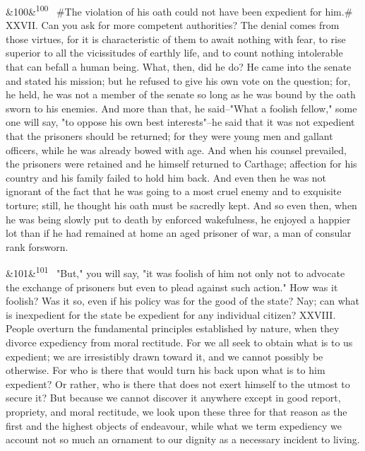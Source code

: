 \documentclass[12pt]{article}
\newcommand{\para}[1][]{\par\noindent\ifx&#1&\else\textsuperscript{\footnotesize #1}~\fi}
\begin{document}
\para[100] \#The violation of his oath could not have been expedient for him.\# XXVII. Can you ask for more competent authorities? The denial comes from those virtues, for it is characteristic of them to await nothing with fear, to rise superior to all the vicissitudes of earthly life, and to count nothing intolerable that can befall a human being. What, then, did he do? He came into the senate and stated his mission; but he refused to give his own vote on the question; for, he held, he was not a member of the senate so long as he was bound by the oath sworn to his enemies. And more than that, he said--"What a foolish fellow," some one will say, "to oppose his own best interests"--he said that it was not expedient that the prisoners should be returned; for they were young men and gallant officers, while he was already bowed with age. And when his counsel prevailed, the prisoners were retained and he himself returned to Carthage; affection for his country and his family failed to hold him back. And even then he was not ignorant of the fact that he was going to a most cruel enemy and to exquisite torture; still, he thought his oath must be sacredly kept. And so even then, when he was being slowly put to death by enforced wakefulness, he enjoyed a happier lot than if he had remained at home an aged prisoner of war, a man of consular rank forsworn.

\para[101] "But," you will say, "it was foolish of him not only not to advocate the exchange of prisoners but even to plead against such action." How was it foolish? Was it so, even if his policy was for the good of the state? Nay; can what is inexpedient for the state be expedient for any individual citizen? XXVIII. People overturn the fundamental principles established by nature, when they divorce expediency from moral rectitude. For we all seek to obtain what is to us expedient; we are irresistibly drawn toward it, and we cannot possibly be otherwise. For who is there that would turn his back upon what is to him expedient? Or rather, who is there that does not exert himself to the utmost to secure it? But because we cannot discover it anywhere except in good report, propriety, and moral rectitude, we look upon these three for that reason as the first and the highest objects of endeavour, while what we term expediency we account not so much an ornament to our dignity as a necessary incident to living.
\end{document}
